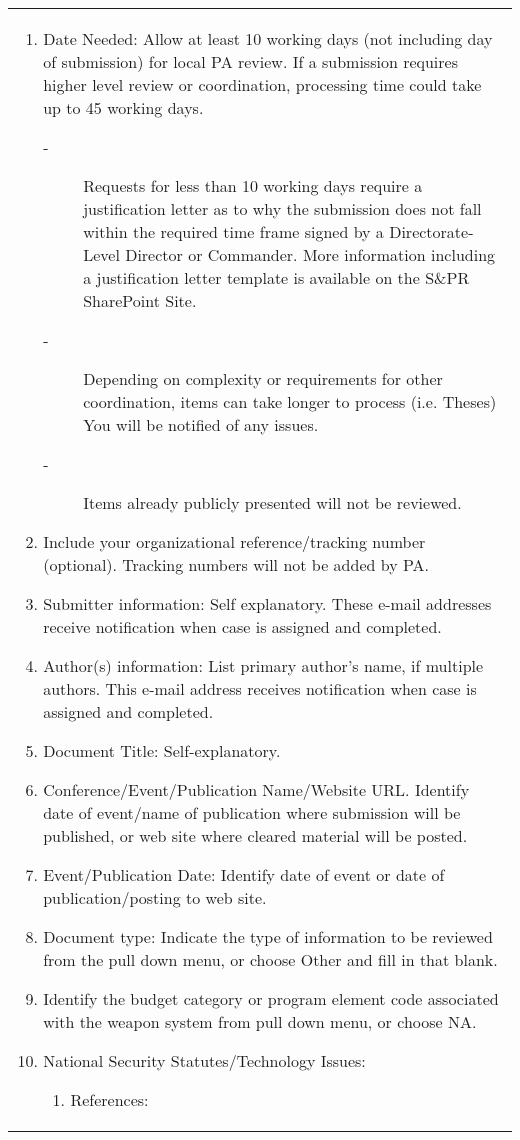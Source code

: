 \documentclass{article}
\begin{document}
{\begin{tabular}{|l|}
{\begin{enumerate}
\item Date Needed:  Allow at least 10 working days (not including day of submission) for local PA review.  If a submission requires higher level review or coordination, processing time could take up to 45 working days.
\begin{description}
  \item[-] Requests for less than 10 working days require a justification letter as to why the submission does not fall within the required time frame signed by a Directorate-Level Director or Commander.  More information including a justification letter template is available on the S\&PR SharePoint Site.
  \item[-] Depending on complexity or requirements for other coordination, items can take longer to process (i.e. Theses)  You will be notified of any issues.
  \item[-] Items already publicly presented will not be reviewed.
\end{description}
\item Include your organizational reference/tracking number (optional). Tracking numbers will not be added by PA.
\item Submitter information:  Self explanatory. These e-mail addresses receive notification when case is assigned and completed.
\item Author(s) information: List primary author’s name, if multiple authors.
This e-mail address receives notification when case is assigned and completed.
\item Document Title: Self-explanatory.
\item Conference/Event/Publication Name/Website URL. Identify date of event/name of publication where submission will be published, or web site where
cleared material will be posted.
\item Event/Publication Date:  Identify date of event or date of publication/posting to web site.
\item Document type:  Indicate the type of information to be reviewed from the pull down menu, or choose Other and fill in that blank.
\item Identify the budget category or program element code associated with the weapon system from pull down menu, or choose NA.
\item National Security Statutes/Technology Issues:
\begin{enumerate}
  \item References:

\end{enumerate}
\end{enumerate}}
\end{tabular}}
\end{document}
